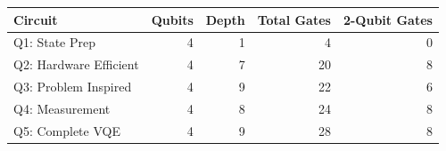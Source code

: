 \begin{tabular}{lrrrr}
\toprule
Circuit & Qubits & Depth & Total Gates & 2-Qubit Gates \\
\midrule
Q1: State Prep & 4 & 1 & 4 & 0 \\
Q2: Hardware Efficient & 4 & 7 & 20 & 8 \\
Q3: Problem Inspired & 4 & 9 & 22 & 6 \\
Q4: Measurement & 4 & 8 & 24 & 8 \\
Q5: Complete VQE & 4 & 9 & 28 & 8 \\
\bottomrule
\end{tabular}
